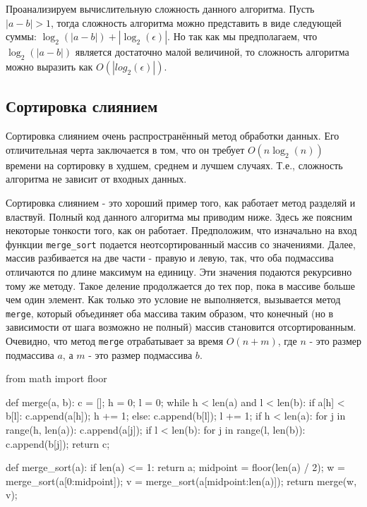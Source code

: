 Проанализируем вычислительную сложность данного алгоритма. 
Пусть $|a-b|>1$, тогда сложность алгоритма можно представить в виде 
следующей суммы: $\log_2(|a-b|) + |\log_2(\epsilon)|$. Но так как 
мы предполагаем, что $\log_2(|a-b|)$ является достаточно 
малой величиной, то сложность алгоритма можно выразить как 
$O(|log_2(\epsilon)|)$.


\subsection{Сортировка слиянием}

Сортировка слиянием очень распространённый метод обработки данных. 
Его отличительная черта заключается в том, что он требует $O(n\log_2(n))$
времени на сортировку в худшем, среднем и лучшем случаях. Т.е., сложность 
алгоритма не зависит от входных данных.

Сортировка слиянием - это хороший пример того, как работает метод разделяй и
властвуй. Полный код данного алгоритма мы приводим ниже. Здесь же поясним
некоторые тонкости того, как он работает. Предположим, что изначально на вход функции 
\texttt{merge\_sort} подается неотсортированный массив со значениями.
Далее, массив разбивается на две части - правую и левую, так, что оба 
подмассива отличаются по длине максимум на единицу. Эти значения подаются 
рекурсивно тому же методу. Такое деление продолжается до тех пор, пока
в массиве больше чем один элемент. Как только это условие не выполняется,
вызывается метод \texttt{merge}, который объединяет оба массива таким
образом, что конечный (но в зависимости от шага возможно не полный) массив
становится отсортированным. Очевидно, что метод \texttt{merge} отрабатывает
за время $O(n + m)$, где $n$ - это размер подмассива $a$, а $m$ - это 
размер подмассива $b$.

\begin{python}

from math import floor

def merge(a, b):
	c = [];
	h = 0;
	l = 0;
	while h < len(a) and l < len(b):
		if a[h] < b[l]:
			c.append(a[h]);
			h += 1;
		else:
			c.append(b[l]);
			l += 1;
	if h < len(a):
		for j in range(h, len(a)):
			c.append(a[j]);
	if l < len(b):
		for j in range(l, len(b)):
			c.append(b[j]);
	return c;

def merge_sort(a):
	if len(a) <= 1:
		return a;
	midpoint = floor(len(a) / 2);
	w = merge_sort(a[0:midpoint]);
	v = merge_sort(a[midpoint:len(a)]);
	return merge(w, v);
\end{python}

